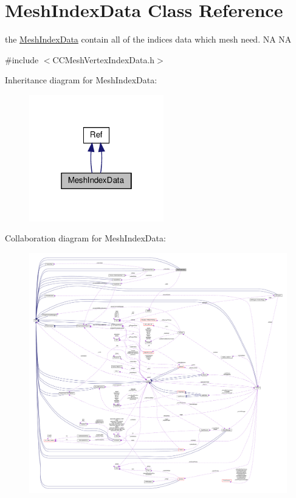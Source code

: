 \hypertarget{classMeshIndexData}{}\section{Mesh\+Index\+Data Class Reference}
\label{classMeshIndexData}


the \hyperlink{classMeshIndexData}{Mesh\+Index\+Data} contain all of the indices data which mesh need.  NA  NA  




{\ttfamily \#include $<$C\+C\+Mesh\+Vertex\+Index\+Data.\+h$>$}



Inheritance diagram for Mesh\+Index\+Data\+:
\nopagebreak
\begin{figure}[H]
\begin{center}
\leavevmode
\includegraphics[width=166pt]{classMeshIndexData__inherit__graph}
\end{center}
\end{figure}


Collaboration diagram for Mesh\+Index\+Data\+:
\nopagebreak
\begin{figure}[H]
\begin{center}
\leavevmode
\includegraphics[width=350pt]{classMeshIndexData__coll__graph}
\end{center}
\end{figure}
